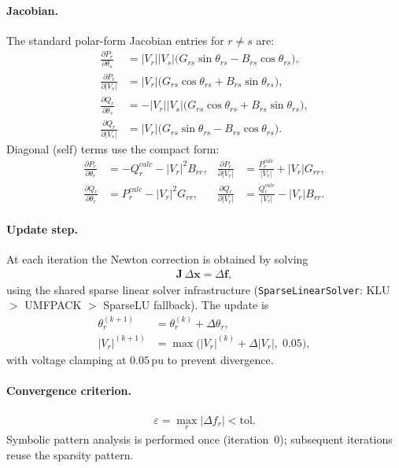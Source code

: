 \paragraph{Jacobian.}
The standard polar-form Jacobian entries for $r \neq s$ are:
\begin{align}
  \frac{\partial P_r}{\partial \theta_s} &=
    |V_r||V_s|\bigl(G_{rs}\sin\theta_{rs} - B_{rs}\cos\theta_{rs}\bigr), \\[3pt]
  \frac{\partial P_r}{\partial |V_s|} &=
    |V_r|\bigl(G_{rs}\cos\theta_{rs} + B_{rs}\sin\theta_{rs}\bigr), \\[3pt]
  \frac{\partial Q_r}{\partial \theta_s} &=
    -|V_r||V_s|\bigl(G_{rs}\cos\theta_{rs} + B_{rs}\sin\theta_{rs}\bigr), \\[3pt]
  \frac{\partial Q_r}{\partial |V_s|} &=
    |V_r|\bigl(G_{rs}\sin\theta_{rs} - B_{rs}\cos\theta_{rs}\bigr).
\end{align}
Diagonal (self) terms use the compact form:
\begin{align}
  \frac{\partial P_r}{\partial \theta_r} &= -Q_r^{calc} - |V_r|^2 B_{rr}, &
  \frac{\partial P_r}{\partial |V_r|} &= \frac{P_r^{calc}}{|V_r|} + |V_r| G_{rr}, \\[3pt]
  \frac{\partial Q_r}{\partial \theta_r} &= P_r^{calc} - |V_r|^2 G_{rr}, &
  \frac{\partial Q_r}{\partial |V_r|} &= \frac{Q_r^{calc}}{|V_r|} - |V_r| B_{rr}.
\end{align}

\paragraph{Update step.}
At each iteration the Newton correction is obtained by solving
\begin{align}
  \mathbf{J}\,\Delta\mathbf{x} = \Delta\mathbf{f},
\end{align}
using the shared sparse linear solver infrastructure
(\texttt{SparseLinearSolver}: KLU $>$ UMFPACK $>$ SparseLU fallback).
The update is
\begin{align}
  \theta_r^{(k+1)} &= \theta_r^{(k)} + \Delta\theta_r, \\
  |V_r|^{(k+1)} &= \max\!\bigl(|V_r|^{(k)} + \Delta|V_r|,\; 0.05\bigr),
\end{align}
with voltage clamping at $0.05\,\text{pu}$ to prevent divergence.

\paragraph{Convergence criterion.}
\begin{align}
  \varepsilon = \max_r \bigl|\Delta f_r\bigr| < \text{tol}.
\end{align}
Symbolic pattern analysis is performed once (iteration~0); subsequent iterations
reuse the sparsity pattern.

